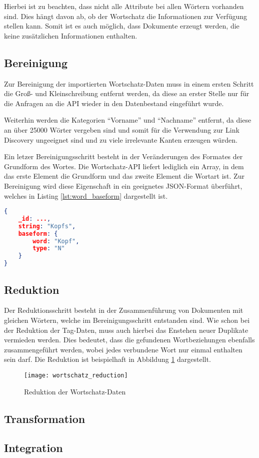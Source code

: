 Hierbei ist zu beachten, dass nicht alle Attribute bei allen Wörtern vorhanden sind. Dies hängt davon ab, ob der Wortschatz die Informationen zur Verfügung stellen kann. Somit ist es auch möglich, dass Dokumente erzeugt werden, die keine zusätzlichen Informationen enthalten.

\subsection{Bereinigung}

Zur Bereinigung der importierten Wortschatz-Daten muss in einem ersten Schritt die Groß- und Kleinschreibung entfernt werden, da diese an erster Stelle nur für die Anfragen an die API wieder in den Datenbestand eingeführt wurde.

Weiterhin werden die Kategorien ``Vorname'' und ``Nachname'' entfernt, da diese an über \num{25000} Wörter vergeben sind und somit für die Verwendung zur Link Discovery ungeeignet sind und zu viele irrelevante Kanten erzeugen würden.

Ein letzer Bereinigungsschritt besteht in der Veränderungen des Formates der Grundform des Wortes. Die Wortschatz-API liefert lediglich ein Array, in dem das erste Element die Grundform und das zweite Element die Wortart ist. Zur Bereinigung wird diese Eigenschaft in ein geeignetes JSON-Format überführt, welches in Listing \ref{lst:word_baseform} dargestellt ist.

\begin{lstlisting}[language=json, label={lst:word_baseform}, caption={Grundform eines Wortes}]
{
    _id: ...,
    string: "Kopfs",
    baseform: {
        word: "Kopf",
        type: "N"
    }
}
\end{lstlisting}

\subsection{Reduktion}

Der Reduktionsschritt besteht in der Zusammenführung von Dokumenten mit gleichen Wörtern, welche im Bereinigungsschritt entstanden sind. Wie schon bei der Reduktion der Tag-Daten, muss auch hierbei das Enstehen neuer Duplikate vermieden werden. Dies bedeutet, dass die gefundenen Wortbeziehungen ebenfalls zusammengeführt werden, wobei jedes verbundene Wort nur einmal enthalten sein darf. Die Reduktion ist beispielhaft in Abbildung \ref{fig:wortschatz_reduction} dargestellt.

\begin{figure}
\centering
\texttt{[image: wortschatz\_reduction]}
\caption{Reduktion der Wortschatz-Daten}
\label{fig:wortschatz_reduction}
\end{figure}


\subsection{Transformation}

\subsection{Integration}